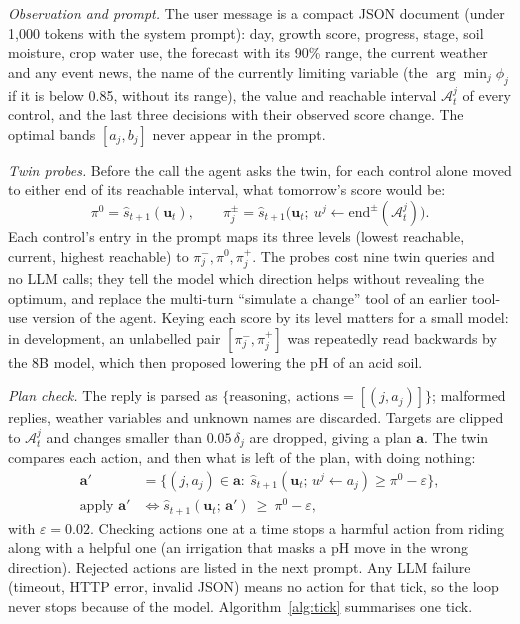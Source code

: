 \documentclass[conference]{IEEEtran}
\begin{document}
\textit{Observation and prompt.} The user message is a compact JSON document (under
1{,}000 tokens with the system prompt): day, growth score, progress, stage, soil moisture, crop water use, the forecast with its
90\% range, the current weather and any event news, the name of the currently limiting variable
(the $\arg\min_j\phi_j$ if it is below 0.85, without its range), the value and reachable interval
$\mathcal A_t^j$ of every control, and the last three decisions with their observed score change.
The optimal bands $[a_j,b_j]$ never appear in the prompt.

\textit{Twin probes.} Before the call the agent asks the twin, for each control alone moved to
either end of its reachable interval, what tomorrow's score would be:
\begin{equation}
\pi^0=\hat s_{t+1}(\mathbf u_t),\qquad
\pi_j^{\pm}=\hat s_{t+1}\bigl(\mathbf u_t;\ u^j\leftarrow\text{end}^{\pm}(\mathcal A_t^j)\bigr).
\label{eq:probe}
\end{equation}
Each control's entry in the prompt maps its three levels (lowest reachable, current, highest
reachable) to $\pi_j^-,\pi^0,\pi_j^+$. The probes cost nine twin queries and no LLM calls; they
tell the model which direction helps without revealing the optimum, and replace the multi-turn
``simulate a change'' tool of an earlier tool-use version of the agent. Keying each score by its
level matters for a small model: in development, an unlabelled pair $[\pi_j^-,\pi_j^+]$ was
repeatedly read backwards by the 8B model, which then proposed lowering the pH of an acid soil.

\textit{Plan check.} The reply is parsed as
$\{\text{reasoning},\ \text{actions}=[(j,\hat a_j)]\}$; malformed replies, weather variables and
unknown names are discarded. Targets are clipped to $\mathcal A_t^j$ and changes smaller than
$0.05\,\delta_j$ are dropped, giving a plan $\mathbf a$. The twin compares each action, and then
what is left of the plan, with doing nothing:
\begin{equation}
\begin{aligned}
\mathbf a' &= \bigl\{(j,a_j)\in\mathbf a:\ \hat s_{t+1}(\mathbf u_t;\,u^j\leftarrow a_j)\ge\pi^0-\varepsilon\bigr\},\\
\text{apply } \mathbf a' &\iff \hat s_{t+1}(\mathbf u_t;\,\mathbf a')\ \ge\ \pi^0-\varepsilon,
\end{aligned}
\label{eq:check}
\end{equation}
with $\varepsilon=0.02$. Checking actions one at a time stops a harmful action from riding along
with a helpful one (an irrigation that masks a pH move in the wrong direction). Rejected actions
are listed in the next prompt. Any LLM failure (timeout, HTTP error,
invalid JSON) means no action for that tick, so the loop never stops because of the model.
Algorithm~\ref{alg:tick} summarises one tick.
\end{document}
